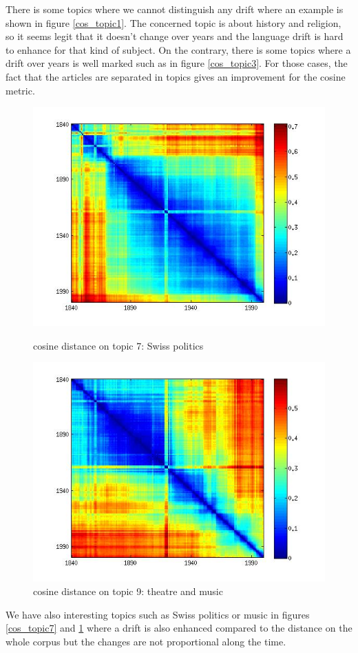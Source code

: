 There is some topics where we cannot distinguish any drift where an example is shown in figure \ref{cos_topic1}. The concerned topic is about history and religion, so it seems legit that it doesn't change over years and the language drift is hard to enhance for that kind of subject. On the contrary, there is some topics where a drift over years is well marked such as in figure \ref{cos_topic3}. For those cases, the fact that the articles are separated in topics gives an improvement for the cosine metric.

\begin{figure}[H]
    \begin{minipage}[b]{0.48\linewidth}
        \includegraphics[scale=0.3]{Pictures/topics/cos/topic7.jpg}
        \caption{cosine distance on topic 7: Swiss politics}
        \label{cos_topic7}
    \end{minipage}\hfill
    \begin{minipage}[b]{0.5\linewidth}
        \includegraphics[scale=0.3]{Pictures/topics/cos/topic9.jpg}
        \caption{cosine distance on topic 9: theatre and music}
        \label{cos_topic9}
    \end{minipage}\hfill
\end{figure}

We have also interesting topics such as Swiss politics or music in figures \ref{cos_topic7} and \ref{cos_topic9} where a drift is also enhanced compared to the distance on the whole corpus but the changes are not proportional along the time.